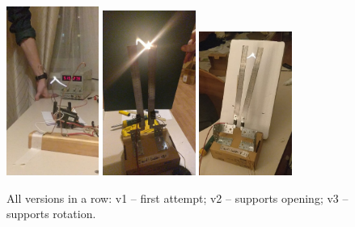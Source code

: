 \begin{figure}[htbp]
	\centering
	\includegraphics[width=0.27\textwidth]{images/v1.jpg}
	\includegraphics[width=0.27\textwidth]{images/v2.jpg}
	\includegraphics[width=0.27\textwidth]{images/v3.jpg}
	\caption*{All versions in a row: v1 -- first attempt; v2 -- supports opening; v3 -- supports rotation.}
	\label{circuit}
\end{figure}